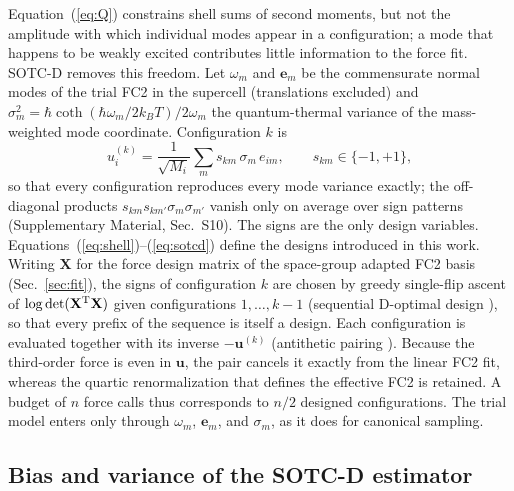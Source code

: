\documentclass[aip,jap,reprint,amsmath,amssymb,floatfix]{revtex4-2}
\begin{document}
Equation~(\ref{eq:Q}) constrains shell sums of second moments, but not the
amplitude with which individual modes appear in a configuration; a mode that
happens to be weakly excited contributes little information to the force fit.
SOTC-D removes this freedom. Let $\omega_m$ and $\mathbf e_m$ be the
commensurate normal modes of the trial FC2 in the supercell (translations
excluded) and
$\sigma_m^2=\hbar\coth(\hbar\omega_m/2k_BT)/2\omega_m$ the quantum-thermal
variance of the mass-weighted mode coordinate. Configuration $k$ is
\begin{equation}
u_{i}^{(k)}=\frac{1}{\sqrt{M_i}}\sum_m s_{km}\,\sigma_m\,e_{im},\qquad
s_{km}\in\{-1,+1\},
\label{eq:sotcd}
\end{equation}
so that every configuration reproduces every mode variance exactly; the
off-diagonal products $s_{km}s_{km'}\sigma_m\sigma_{m'}$ vanish only on
average over sign patterns (Supplementary Material, Sec.~S10). The signs are
the only design variables. Equations~(\ref{eq:shell})--(\ref{eq:sotcd})
define the designs introduced in this work. Writing $\mathbf X$ for the force design matrix of the
space-group adapted FC2 basis (Sec.~\ref{sec:fit}), the signs of configuration
$k$ are chosen by greedy single-flip ascent of
$\log\det(\mathbf X^{\rm T}\mathbf X)$ given configurations $1,\dots,k-1$
(sequential D-optimal design \cite{ref57}), so that every prefix of the
sequence is itself a design. Each configuration is evaluated together with its
inverse $-\mathbf u^{(k)}$ (antithetic pairing \cite{ref58}). Because the third-order force is even in
$\mathbf u$, the pair cancels it exactly from the linear FC2 fit, whereas the
quartic renormalization that defines the effective FC2 is retained. A budget of
$n$ force calls thus corresponds to $n/2$ designed configurations. The
trial model enters only through $\omega_m$, $\mathbf e_m$, and $\sigma_m$, as
it does for canonical sampling.

\subsection{Bias and variance of the SOTC-D estimator}\label{sec:biasvar}
\end{document}
